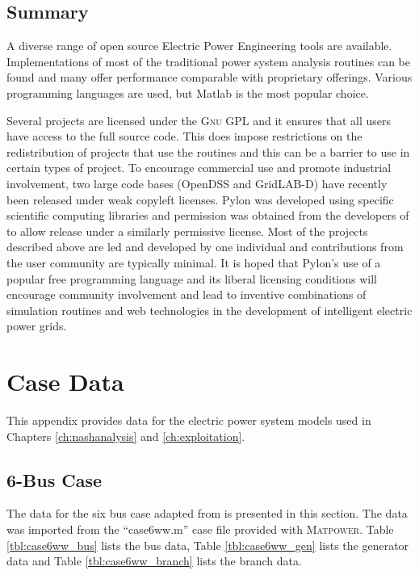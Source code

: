 \section{Summary}
A diverse range of open source Electric Power Engineering tools are available.
Implementations of most of the traditional power system analysis routines can be
found and many offer performance comparable with proprietary offerings.  Various
programming languages are used, but Matlab is the most popular choice.

Several projects are licensed under the \textsc{Gnu} GPL and it ensures that all
users have access to the full source code.  This does impose restrictions on the
redistribution of projects that use the routines and this can be a barrier to
use in certain types of project.  To encourage commercial use and promote
industrial involvement, two large code bases (OpenDSS and GridLAB-D) have
recently been released under weak copyleft licenses.  Pylon was developed using
specific scientific computing libraries and permission was obtained from the
developers of \matpower to allow release under a similarly permissive license.
Most of the projects described above are led and developed by one individual
and contributions from the user community are typically minimal.  It is hoped
that Pylon's use of a popular free programming language and its liberal
licensing conditions will encourage community involvement and lead to inventive
combinations of simulation routines and web technologies in the
development of intelligent electric power grids.

\chapter{Case Data}
This appendix provides data for the electric power system models used in
Chapters \ref{ch:nashanalysis} and \ref{ch:exploitation}.

\section{6-Bus Case}
\label{adx:case6ww}
The data for the six bus case adapted from  is presented in this section.  The data was imported from the
``case6ww.m'' case file provided with \textsc{Matpower}.
Table \ref{tbl:case6ww_bus} lists the bus data, Table \ref{tbl:case6ww_gen}
lists the generator data and Table \ref{tbl:case6ww_branch} lists the branch
data.

